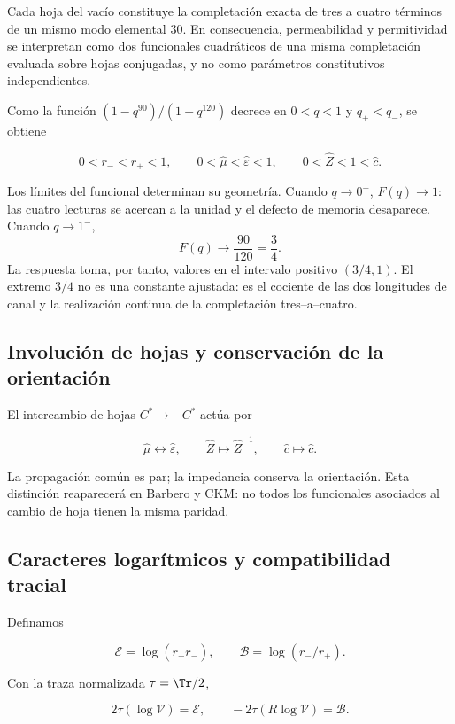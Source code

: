 Cada hoja del vac\'io constituye la completaci\'on exacta de tres a cuatro
t\'erminos de un mismo modo elemental \(30\). En consecuencia, permeabilidad
y permitividad se interpretan como dos funcionales cuadr\'aticos de una misma
completaci\'on evaluada sobre hojas conjugadas, y no como par\'ametros
constitutivos independientes.

Como la funci\'on \((1-q^{90})/(1-q^{120})\) decrece en \(0<q<1\) y \(q_+<q_-\), se obtiene

\[
0<r_-<r_+<1,\qquad
0<\widehat\mu<\widehat\varepsilon<1,\qquad
0<\widehat Z<1<\widehat c.
\]

Los l\'imites del funcional determinan su geometr\'ia. Cuando \(q\to0^+\),
\(F(q)\to1\): las cuatro lecturas se acercan a la unidad y el defecto de
memoria desaparece. Cuando \(q\to1^-\),
\[
F(q)\longrightarrow\frac{90}{120}=\frac34.
\]
La respuesta toma, por tanto, valores en el intervalo positivo \((3/4,1)\). El
extremo \(3/4\) no es una constante ajustada: es el cociente de las dos
longitudes de canal y la realizaci\'on continua de la completaci\'on
tres--a--cuatro.

\subsection{Involuci\'on de hojas y conservaci\'on de la orientaci\'on}

El intercambio de hojas \(C^*\mapsto-C^*\) act\'ua por

\begin{equation}
\widehat\mu\longleftrightarrow\widehat\varepsilon,\qquad
\widehat Z\longmapsto\widehat Z^{-1},
\qquad
\widehat c\longmapsto\widehat c.
\label{rm:eq:vacuum-sheet}
\end{equation}

La propagaci\'on com\'un es par; la impedancia conserva la orientaci\'on.
Esta distinci\'on reaparecer\'a en Barbero y CKM: no todos los funcionales
asociados al cambio de hoja tienen la misma paridad.

\subsection{Caracteres logar\'itmicos y compatibilidad tracial}

Definamos

\[
\mathcal E=\log(r_+r_-),\qquad
\mathcal B=\log(r_-/r_+).
\]

Con la traza normalizada \(\tau=\Tr/2\),

\begin{equation}
2\tau(\log\mathcal V)=\mathcal E,
\qquad
-2\tau(R\log\mathcal V)=\mathcal B.
\label{rm:eq:vacuum-traces}
\end{equation}

